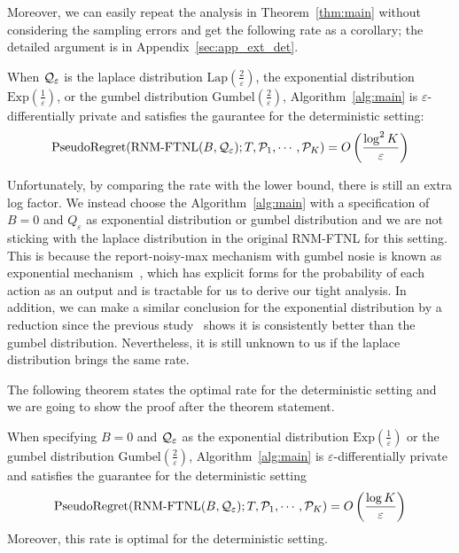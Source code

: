 Moreover, we can easily repeat the analysis in Theorem~\ref{thm:main} without considering the sampling errors and get the following rate as a corollary; the detailed argument is in Appendix~\ref{sec:app_ext_det}.
\begin{corollary}
\label{cor:ext_det}
	When $\mathcal{Q}_{\varepsilon}$ is the laplace distribution $\mathrm{Lap}(\frac{2}{\varepsilon})$, the exponential distribution $\mathrm{Exp}(\frac{1}{\varepsilon})$, or the gumbel distribution $\mathrm{Gumbel}(\frac{2}{\varepsilon})$, Algorithm~\ref{alg:main} is $\varepsilon$-differentially private and satisfies the gaurantee for the deterministic setting:
	\begin{align*}
		\mathrm{PseudoRegret}(\text{RNM-FTNL}(B, \mathcal{Q}_{\varepsilon}); T, \mathcal{P}_1, \cdots, \mathcal{P}_K) = O\left(\frac{\log^2 K}{\varepsilon}\right)
	\end{align*}
\end{corollary}

Unfortunately, by comparing the rate with the lower bound, there is still an extra log factor.
We instead choose the Algorithm~\ref{alg:main} with a specification of $B=0$ and $Q_{\varepsilon}$ as exponential distribution or gumbel distribution and we are not sticking with the laplace distribution in the original RNM-FTNL \citep{hu2021near} for this setting.
This is because the report-noisy-max mechanism with gumbel nosie is known as exponential mechanism~\citep{qiao2021oneshot}, which has explicit forms for the probability of each action as an output and is tractable for us to derive our tight analysis.
In addition, we can make a similar conclusion for the exponential distribution by a reduction since the previous study~\citep{mckenna2020permute} shows it is consistently better than the gumbel distribution. 
Nevertheless, it is still unknown to us if the laplace distribution brings the same rate.

The following theorem states the optimal rate for the deterministic setting and we are going to show the proof after the theorem statement.

\begin{theorem}
\label{thm:upper_det}
	When specifying $B=0$ and $\mathcal{Q}_{\varepsilon}$ as the exponential distribution $\mathrm{Exp}(\frac{1}{\varepsilon})$ or the gumbel distribution $\mathrm{Gumbel}(\frac{2}{\varepsilon})$, Algorithm~\ref{alg:main} is $\varepsilon$-differentially private and satisfies the guarantee for the deterministic setting
	\begin{align*}
		\mathrm{PseudoRegret}(\text{RNM-FTNL}(B, \mathcal{Q}_{\varepsilon}); T, \mathcal{P}_1, \cdots, \mathcal{P}_K) = O\left( \frac{\log K}{\varepsilon}\right)
	\end{align*}
	Moreover, this rate is optimal for the deterministic setting.
\end{theorem}

